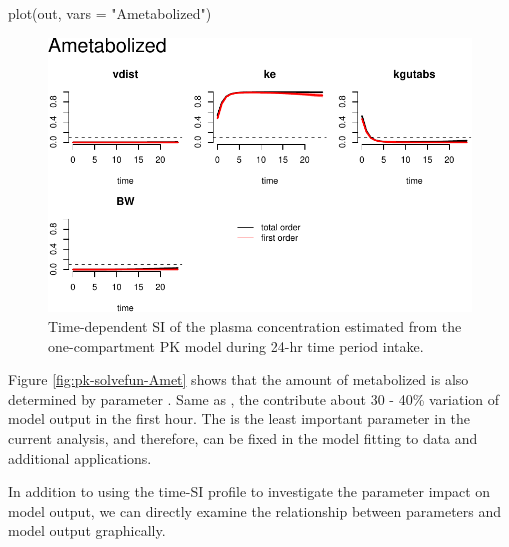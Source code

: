 \begin{Schunk}
\begin{Sinput}
plot(out, vars = "Ametabolized")
\end{Sinput}
\begin{figure}

{\centering \includegraphics[width=0.8\linewidth]{RJ-pksensi_files/figure-latex/unnamed-chunk-12-1} 

}

\caption{\label{fig:pk-solvefun-Amet}Time-dependent SI of the plasma concentration estimated from the one-compartment PK model during 24-hr time period intake.}\label{fig:unnamed-chunk-12}
\end{figure}
\end{Schunk}

Figure \ref{fig:pk-solvefun-Amet} shows that the amount of metabolized
is also determined by parameter . Same as ,
the  contribute about 30 - 40\% variation of model output
in the first hour. The  is the least important parameter in the
current analysis, and therefore, can be fixed in the model fitting to
data and additional applications.

In addition to using the time-SI profile to investigate the parameter
impact on model output, we can directly examine the relationship between
parameters and model output graphically.

